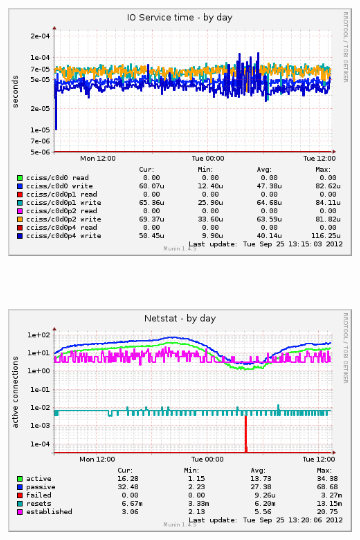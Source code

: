 \documentclass[10pt,a4paper]{article}
\begin{document}
\begin{figure}
        
        \centering
        \begin{subfigure}[b]{0.49\textwidth}
                \centering
                \includegraphics[width=\textwidth]{iostat_ios-day}
                \label{fig:iostat_ios-day}
        \end{subfigure}%
        ~ %
        \begin{subfigure}[b]{0.49\textwidth}
                \centering
                \includegraphics[width=\textwidth]{netstat-day}
                \label{fig:netstat-day}
        \end{subfigure}
        

\end{figure}
\end{document}
